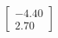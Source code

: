 \documentclass[preview]{standalone}
\begin{document}
\begin{align*}
\begin{bmatrix} -4.40 \\ 2.70 \end{bmatrix}
\end{align*}
\end{document}
